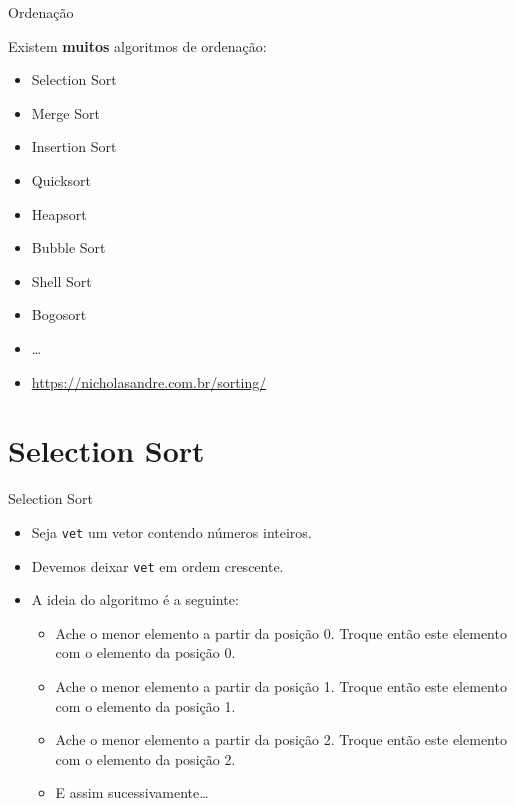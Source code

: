 \documentclass[handout]{beamer}
\newcommand{\cod}[1]{\texttt{#1}}
\begin{document}
\begin{frame}[fragile]{Ordenação}

    Existem \textbf{muitos} algoritmos de ordenação:
    \begin{itemize}
        \item Selection Sort
        \item Merge Sort
        \item Insertion Sort
        \item Quicksort
        \item Heapsort
        \item Bubble Sort
        \item Shell Sort
        \item Bogosort
        \item \ldots
        \item \url{https://nicholasandre.com.br/sorting/}
    \end{itemize}

\end{frame}

\section{Selection Sort}

\begin{frame}[fragile]{Selection Sort}

    \begin{itemize}
        \item Seja \cod{vet} um vetor contendo números inteiros.
        \item Devemos deixar \cod{vet} em ordem crescente.
        \item A ideia do algoritmo é a seguinte:
        \begin{itemize}
            \item Ache o menor elemento a partir da posição 0. Troque então este elemento com o elemento da posição 0.
            \item Ache o menor elemento a partir da posição 1. Troque então este elemento com o elemento da posição 1.
            \item Ache o menor elemento a partir da posição 2. Troque então este elemento com o elemento da posição 2.
            \item E assim sucessivamente\ldots
        \end{itemize}
     \end{itemize}

\end{frame}
\end{document}
